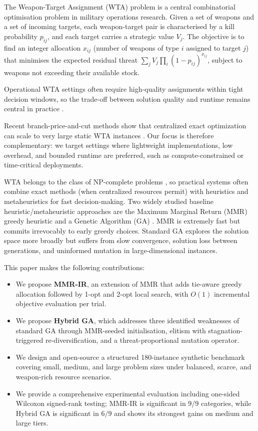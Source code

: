 \documentclass[10pt,conference]{IEEEtran}
\begin{document}
The Weapon-Target Assignment (WTA) problem is a central combinatorial
optimisation problem in military operations research.  Given a set of weapons
and a set of incoming targets, each weapon-target pair is characterised by a
kill probability $p_{ij}$, and each target carries a strategic value $V_j$.
The objective is to find an integer allocation $x_{ij}$ (number of weapons of
type $i$ assigned to target $j$) that minimises the expected residual threat
$\sum_j V_j \prod_i (1-p_{ij})^{x_{ij}}$, subject to weapons not exceeding their
available stock.

Operational WTA settings often require high-quality assignments within tight
decision windows, so the trade-off between solution quality and runtime remains
central in practice \cite{kline2020}.

Recent branch-price-and-cut methods show that centralized exact optimization can
scale to very large static WTA instances \cite{bertsimas2025}.  Our focus is
therefore complementary: we target settings where lightweight implementations,
low overhead, and bounded runtime are preferred, such as compute-constrained or
time-critical deployments.

WTA belongs to the class of NP-complete problems \cite{ahuja2007,lloyd1986},
so practical systems often combine exact methods (when centralized resources
permit) with heuristics and metaheuristics for fast decision-making.
Two widely studied baseline heuristic/metaheuristic approaches are the
Maximum Marginal Return (MMR) greedy heuristic and a Genetic Algorithm (GA)
\cite{ahuja2007,kline2020}.  MMR is extremely fast but commits irrevocably to
early greedy choices.  Standard GA explores the solution space more broadly
but suffers from slow convergence, solution loss between generations, and
uninformed mutation in large-dimensional instances.

This paper makes the following contributions:

\begin{itemize}
  \item We propose \textbf{MMR-IR}, an extension of MMR that adds tie-aware
        greedy allocation followed by 1-opt and 2-opt local search, with
        $O(1)$ incremental objective evaluation per trial.
  \item We propose \textbf{Hybrid GA}, which addresses three identified
        weaknesses of standard GA through MMR-seeded initialisation, elitism
      with stagnation-triggered re-diversification, and a
        threat-proportional mutation operator.
  \item We design and open-source a structured 180-instance synthetic
        benchmark covering small, medium, and large problem sizes under
        balanced, scarce, and weapon-rich resource scenarios.
  \item We provide a comprehensive experimental evaluation including
        one-sided Wilcoxon signed-rank testing; MMR-IR is significant in
        $9/9$ categories, while Hybrid GA is significant in $6/9$ and shows
        its strongest gains on medium and large tiers.
\end{itemize}
\end{document}
